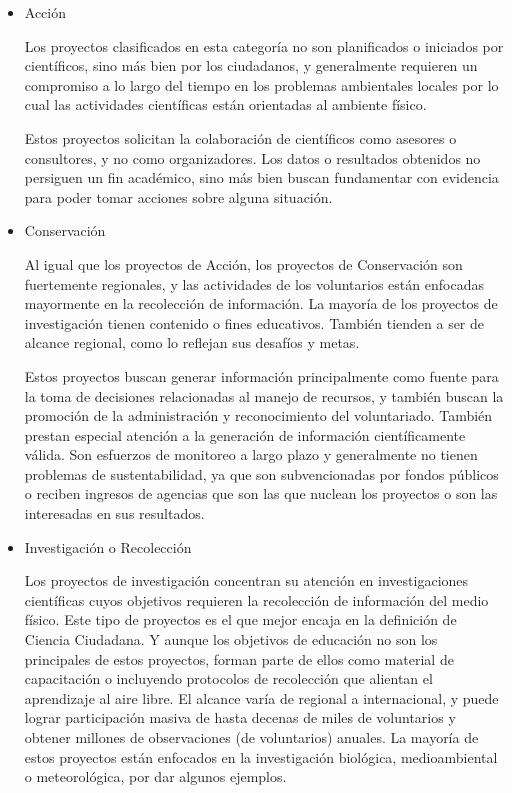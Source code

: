 \begin{itemize}
	\item {Acción}
		
		Los proyectos clasificados en esta categoría no son planificados o iniciados por científicos, sino más bien por los ciudadanos, y generalmente requieren un compromiso a lo largo del tiempo en los problemas ambientales locales por lo cual las actividades científicas están orientadas al ambiente físico. 
		
		Estos proyectos solicitan la colaboración de científicos como asesores o consultores, y no como organizadores. Los datos o resultados obtenidos no persiguen un fin académico, sino más bien buscan fundamentar con evidencia para poder tomar acciones sobre alguna situación. 
	\item {Conservación} 
	
	Al igual que los proyectos de Acción, los proyectos de Conservación son fuertemente regionales, y las actividades de los voluntarios están enfocadas mayormente en la recolección de información. La mayoría de los proyectos de investigación tienen contenido o fines educativos. También tienden a ser de alcance regional, como lo reflejan sus desafíos y metas.
	
	Estos proyectos buscan generar información principalmente como fuente para la toma de decisiones relacionadas al manejo de recursos, y también buscan la promoción de la administración y reconocimiento del voluntariado. También prestan especial atención a la generación de información científicamente válida. Son esfuerzos de monitoreo a largo plazo y generalmente no tienen problemas de sustentabilidad, ya que son subvencionadas por fondos públicos o reciben ingresos de agencias que son las que nuclean los proyectos o son las interesadas en sus resultados.
	
	\item {Investigación o Recolección} 
	
	Los proyectos de investigación concentran su atención en investigaciones científicas cuyos objetivos requieren la recolección de información del medio físico. Este tipo de proyectos es el que mejor encaja en la definición de Ciencia Ciudadana. Y aunque los objetivos de educación no son los principales de estos proyectos, forman parte de ellos como material de capacitación o incluyendo protocolos de recolección que alientan el aprendizaje al aire libre. El alcance varía de regional a internacional, y puede lograr participación masiva de hasta decenas de miles de voluntarios y obtener millones de observaciones (de voluntarios) anuales. La mayoría de estos proyectos están enfocados en la investigación biológica, medioambiental o meteorológica, por dar algunos ejemplos. 
	

\end{itemize}
